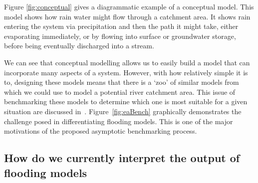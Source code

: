 \documentclass[11pt]{article}
\begin{document}
\hspace{0.05\textwidth}
\begin{minipage}{0.4\textwidth}
    \qquad Figure \ref{fig:conceptual} gives a diagrammatic example of a conceptual model. This model shows how rain water might flow through a catchment area. It shows rain entering the system via precipitation and then the path it might take, either evaporating immediately, or by flowing into surface or groundwater storage, before being eventually discharged into a stream.

    \qquad We can see that conceptual modelling allows us to easily build a model that can incorporate many aspects of a system. However, with how relatively simple it is to, designing these models means that there is a `zoo' of similar models from which we could use to model a potential river catchment area. This issue of benchmarking these models to determine which one is most suitable for a given situation are discussed in~\cite{neelz2013benchmarking}. 
    Figure~\ref{fig:eaBench}  graphically demonstrates the challenge posed in differentiating flooding models. This is one of the major motivations of the proposed asymptotic benchmarking process.
\end{minipage}



\subsection{How do we currently interpret the output of flooding models}
\end{document}
